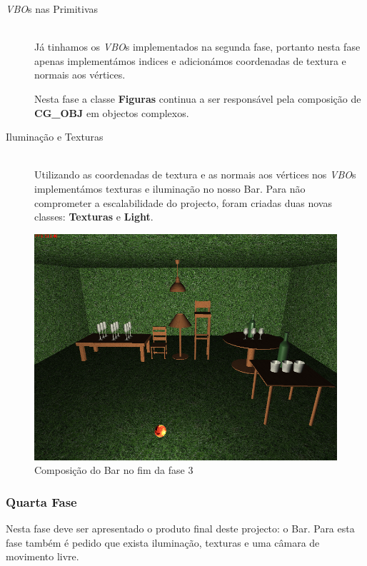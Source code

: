 \documentclass[a5paper,onecolumn, 11pt]{article}
\begin{document}
\begin{description}
	\item[\textit{VBO}s nas Primitivas] \hfill \\
	Já tinhamos os \textit{VBO}s implementados na segunda fase, portanto nesta fase apenas implementámos indices e adicionámos coordenadas de textura e normais aos vértices.
	
	Nesta fase a classe \textbf{Figuras} continua a ser responsável pela composição de \textbf{CG\_OBJ} em objectos complexos.
	
	\item[Iluminação e Texturas] \hfill \\
	Utilizando as coordenadas de textura e as normais aos vértices nos \textit{VBO}s implementámos texturas e iluminação no nosso Bar. Para não comprometer a escalabilidade do projecto, foram criadas duas novas classes: \textbf{Texturas} e \textbf{Light}. 

\end{description}
\newpage

\begin{figure}[!htb]
    \centering
    \includegraphics[scale=0.5]{fase3.png}
    \caption{Composição do Bar no fim da fase 3}
\end{figure}

\clearpage
\subsubsection{Quarta Fase}
Nesta fase deve ser apresentado o produto final deste projecto: o Bar. Para esta fase também é pedido que exista iluminação, texturas e uma câmara de movimento livre.
\end{document}
